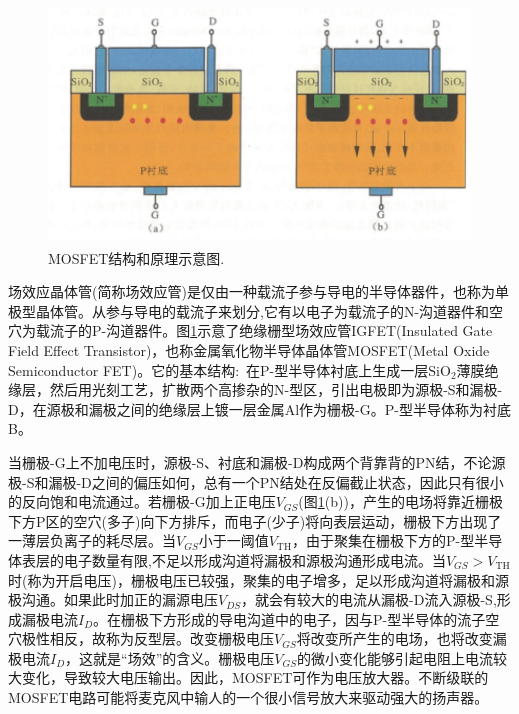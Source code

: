 \begin{figure}[h!]
\centering
\vspace*{-0.10in}
\includegraphics[height=2.50in,width=4.40in,viewport=0 0 100 55,clip]{Figures/MOSFET.png}
\caption{\small \textrm{MOSFET结构和原理示意图.}}%
\label{Fig:MOSFET}
\end{figure} 
场效应晶体管(简称场效应管)是仅由一种载流子参与导电的半导体器件，也称为单极型晶体管。从参与导电的载流子来划分,它有以电子为载流子的N-沟道器件和空穴为载流子的P-沟道器件。图\ref{Fig:MOSFET}示意了绝缘栅型场效应管IGFET(Insulated Gate Field Effect Transistor)，也称金属氧化物半导体晶体管MOSFET(Metal Oxide Semiconductor FET)。它的基本结构:~在P-型半导体衬底上生成一层$\mathrm{SiO}_2$薄膜绝缘层，然后用光刻工艺，扩散两个高掺杂的N-型区，引出电极即为源极-S和漏极-D，在源极和漏极之间的绝缘层上镀一层金属Al作为栅极-G。P-型半导体称为衬底B。 

当栅极-G上不加电压时，源极-S、衬底和漏极-D构成两个背靠背的PN结，不论源极-S和漏极-D之间的偏压如何，总有一个PN结处在反偏截止状态，因此只有很小的反向饱和电流通过。若栅极-G加上正电压$V_{GS}$(图\ref{Fig:MOSFET}(b))，产生的电场将靠近栅极下方P区的空穴(多子)向下方排斥，而电子(少子)将向表层运动，栅极下方出现了一薄层负离子的耗尽层。当$V_{GS}$小于一阈值$V_{\mathrm{TH}}$，由于聚集在栅极下方的P-型半导体表层的电子数量有限,不足以形成沟道将漏极和源极沟通形成电流。当$V_{GS}>V_{\mathrm{TH}}$时(称为开启电压)，栅极电压已较强，聚集的电子增多，足以形成沟道将漏极和源极沟通。如果此时加正的漏源电压$V_{DS}$，就会有较大的电流从漏极-D流入源极-S,形成漏极电流$I_D$。在栅极下方形成的导电沟道中的电子，因与P-型半导体的流子空穴极性相反，故称为反型层。改变栅极电压$V_{GS}$将改变所产生的电场，也将改变漏极电流$I_D$，这就是``场效''的含义。栅极电压$V_{GS}$的微小变化能够引起电阻上电流较大变化，导致较大电压输出。因此，MOSFET可作为电压放大器。不断级联的MOSFET电路可能将麦克风中输人的一个很小信号放大来驱动强大的扬声器。

